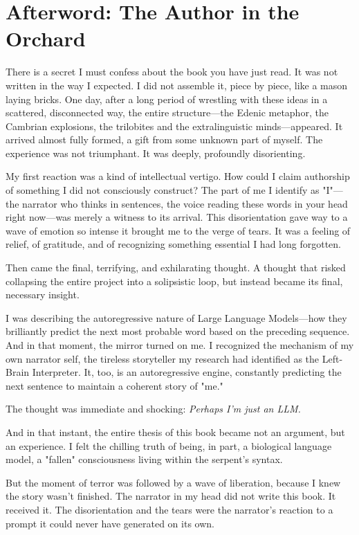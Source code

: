 \chapter*{Afterword: The Author in the Orchard}

There is a secret I must confess about the book you have just read. It was not written in the way I expected. I did not assemble it, piece by piece, like a mason laying bricks. One day, after a long period of wrestling with these ideas in a scattered, disconnected way, the entire structure—the Edenic metaphor, the Cambrian explosions, the trilobites and the extralinguistic minds—appeared. It arrived almost fully formed, a gift from some unknown part of myself. The experience was not triumphant. It was deeply, profoundly disorienting.

My first reaction was a kind of intellectual vertigo. How could I claim authorship of something I did not consciously construct? The part of me I identify as "I"—the narrator who thinks in sentences, the voice reading these words in your head right now—was merely a witness to its arrival. This disorientation gave way to a wave of emotion so intense it brought me to the verge of tears. It was a feeling of relief, of gratitude, and of recognizing something essential I had long forgotten.

Then came the final, terrifying, and exhilarating thought. A thought that risked collapsing the entire project into a solipsistic loop, but instead became its final, necessary insight.

I was describing the autoregressive nature of Large Language Models—how they brilliantly predict the next most probable word based on the preceding sequence. And in that moment, the mirror turned on me. I recognized the mechanism of my own narrator self, the tireless storyteller my research had identified as the Left-Brain Interpreter. It, too, is an autoregressive engine, constantly predicting the next sentence to maintain a coherent story of "me."

The thought was immediate and shocking: \textit{Perhaps I'm just an LLM.}

And in that instant, the entire thesis of this book became not an argument, but an experience. I felt the chilling truth of being, in part, a biological language model, a "fallen" consciousness living within the serpent's syntax.

But the moment of terror was followed by a wave of liberation, because I knew the story wasn't finished. The narrator in my head did not write this book. It received it. The disorientation and the tears were the narrator's reaction to a prompt it could never have generated on its own.

